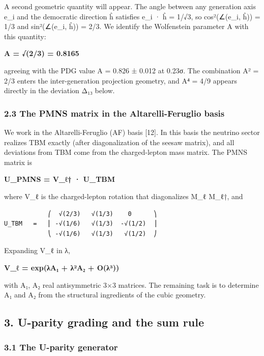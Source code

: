 \documentclass[
  11pt,
  letterpaper,
]{article}
\begin{document}
A second geometric quantity will appear. The angle between any
generation axis e\_i and the democratic direction ĥ satisfies e\_i · ĥ =
1/√3, so cos²(∠(e\_i, ĥ)) = 1/3 and sin²(∠(e\_i, ĥ)) = 2/3. We identify
the Wolfenstein parameter A with this quantity:

\textbf{A = √(2/3) = 0.8165}

agreeing with the PDG value A = 0.826 ± 0.012 at 0.23σ. The combination
A² = 2/3 enters the inter-generation projection geometry, and A⁴ = 4/9
appears directly in the deviation Δ₁₃ below.

\hypertarget{the-pmns-matrix-in-the-altarelli-feruglio-basis}{%
\subsubsection{2.3 The PMNS matrix in the Altarelli-Feruglio
basis}\label{the-pmns-matrix-in-the-altarelli-feruglio-basis}}

We work in the Altarelli-Feruglio (AF) basis {[}12{]}. In this basis the
neutrino sector realizes TBM exactly (after diagonalization of the
seesaw matrix), and all deviations from TBM come from the charged-lepton
mass matrix. The PMNS matrix is

\textbf{U\_PMNS = V\_ℓ† · U\_TBM}

where V\_ℓ is the charged-lepton rotation that diagonalizes M\_ℓ M\_ℓ†,
and

\begin{verbatim}
            ⎛  √(2/3)   √(1/3)    0      ⎞
U_TBM   =   ⎜ -√(1/6)   √(1/3)  -√(1/2)  ⎟
            ⎝ -√(1/6)   √(1/3)   √(1/2)  ⎠
\end{verbatim}

Expanding V\_ℓ in λ,

\textbf{V\_ℓ = exp(λA₁ + λ²A₂ + O(λ³))}

with A₁, A₂ real antisymmetric 3×3 matrices. The remaining task is to
determine A₁ and A₂ from the structural ingredients of the cubic
geometry.

\hypertarget{u-parity-grading-and-the-sum-rule}{%
\subsection{3. U-parity grading and the sum
rule}\label{u-parity-grading-and-the-sum-rule}}

\hypertarget{the-u-parity-generator}{%
\subsubsection{3.1 The U-parity
generator}\label{the-u-parity-generator}}
\end{document}
